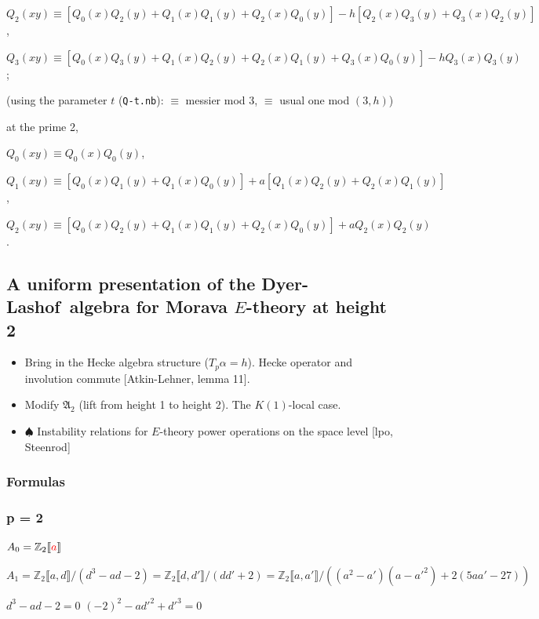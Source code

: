 \documentclass{rs}
\theoremstyle{definition}
\theoremstyle{remark}
\newcommand{\mb}[1]{\mathbb{#1}}
\newcommand{\mf}[1]{\mathfrak{#1}}
\newcommand{\DL}{Dyer-Lashof~}
\newcommand{\BZ}{{\mb Z}}
\newcommand{\A}{\alpha}
\newcommand{\lb}{\llbracket}
\newcommand{\rb}{\rrbracket}
\newcommand{\todo}{\spadesuit}
\renewcommand{\=}{\approx}
\renewcommand{\-}{\sim}
\numberwithin{equation}{section}
\numberwithin{thm}{section}
\begin{document}
$Q_2(xy) \equiv [Q_0(x) Q_2(y) + Q_1(x) Q_1(y) + Q_2(x) Q_0(y)] - h [Q_2(x) Q_3(y) + Q_3(x) Q_2(y)]$,

$Q_3(xy) \equiv [Q_0(x) Q_3(y) + Q_1(x) Q_2(y) + Q_2(x) Q_1(y) + Q_3(x) Q_0(y)] - h Q_3(x) Q_3(y)$;

(using the parameter $t$ (\texttt{Q-t.nb}): $\equiv$ messier mod 3, $\equiv$ usual one mod $(3,h)$)

at the prime 2,

$Q_0(xy) \equiv Q_0(x) Q_0(y)$,

$Q_1(xy) \equiv [Q_0(x) Q_1(y) + Q_1(x) Q_0(y)] + a [Q_1(x) Q_2(y) + Q_2(x) Q_1(y)]$,

$Q_2(xy) \equiv [Q_0(x) Q_2(y) + Q_1(x) Q_1(y) + Q_2(x) Q_0(y)] + a Q_2(x) Q_2(y)$.


\newpage
\subsection{A uniform presentation of the \DL algebra for Morava $E$-theory at height 2}
\label{uniform}

\begin{itemize}
 \item Bring in the Hecke algebra structure ($T_p \A = h$).  
 Hecke operator and involution commute [Atkin-Lehner, lemma 11].  

 \item Modify $\mf A_2$ (lift from height 1 to height 2).  
 The $K(1)$-local case.  

 \item $\todo$ Instability relations for $E$-theory power operations on the space level [lpo, Steenrod] 
\end{itemize}


\subsubsection{Formulas}

\subsubsection*{p = 2}

$A_0 = \BZ_2 \lb \textcolor{red}{a} \rb$ 

$A_1 = \BZ_2 \lb a, d \rb / (d^3 - a d - 2) 
= \BZ_2 \lb d, d' \rb / (d d' + 2) 
= \BZ_2 \lb a, a' \rb / ((a^2 - a') (a - a'^2) + 2 (5 a a' - 27))$ 

$d^3 - a d - 2 = 0$ \hfill $(-2)^2 - a d'^2 + d'^3 = 0$ 
\end{document}
